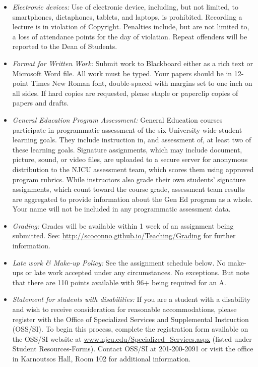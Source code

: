 \documentclass[article,oneside]{memoir}
\begin{document}
\begin{itemize}
\item \textit{Electronic devices:} Use of electronic device, including, but not limited, to smartphones, dictaphones, tablets, and laptops, is prohibited. Recording a lecture is in violation of Copyright. Penalties include, but are not limited to, a loss of attendance points for the day of violation. Repeat offenders will be reported to the Dean of Students.

\item \textit{Format for Written Work:} Submit work to Blackboard either as a rich text or Microsoft Word file. All work must be typed. Your papers should be in 12-point Times New Roman font, double-spaced with margins set to one inch on all sides. If hard copies are requested, please staple or paperclip copies of papers and drafts.


\item \textit{General Education Program Assessment:} General Education courses participate in programmatic assessment of the six University-wide student learning goals. They include instruction in, and assessment of, at least two of these learning goals. Signature assignments, which may include document, picture, sound, or video files, are uploaded to a secure server for anonymous distribution to the NJCU assessment team, which scores them using approved program rubrics. While instructors also grade their own students’ signature assignments, which count toward the course grade, assessment team results are aggregated to provide information about the Gen Ed program as a whole. Your name will not be included in any programmatic assessment data.

\item \textit{Grading:} Grades will be available within 1 week of an assignment being submitted. See: \href{http://scoconno.github.io/Teaching/Grading}{http://scoconno.github.io/Teaching/Grading} for further information.


\item \textit{Late work \& Make-up Policy:} See the assignment schedule below. No make-ups or late work accepted under any circumstances. No exceptions. But note that there are 110 points available with 96+ being required for an A.


\item \textit{Statement for students with disabilities:} If you are a student with a disability and wish to receive consideration for reasonable accommodations, please register with the Office of Specialized Services and Supplemental Instruction (OSS/SI). To begin this process, complete the registration form available on the OSS/SI website at
\href{http://www.njcu.edu/Specialized_Services.aspx}{www.njcu.edu/Specialized\_Services.aspx}
(listed under Student Resources-Forms). Contact OSS/SI at 201-200-2091
or visit the office in Karnoutsos Hall, Room 102 for additional
information.

\end{itemize}
\end{document}
